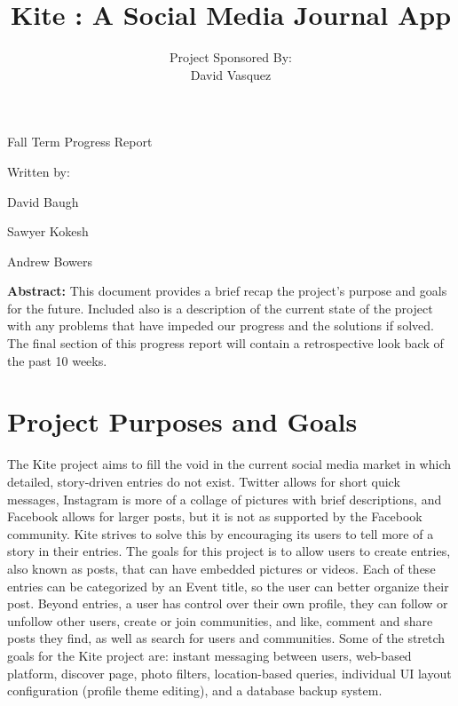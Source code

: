 \documentclass[compsoc, 10, draftclsnofoot, onecolumn]{IEEEtran}
\date{}
\title{Kite : A Social Media Journal App}
\author{ %
	Project Sponsored By: \\
    David Vasquez
}
\begin{document}
\null  %
\nointerlineskip  %
\vfill
\let\snewpage \newpage
\let\newpage \relax
\maketitle
\begin{center}
\huge{Fall Term Progress Report}\par
\vspace{2mm}
\large{Written by:}\par
\normalsize{David Baugh}\par
\normalsize{Sawyer Kokesh}\par
\normalsize{Andrew Bowers}\par
\vspace{8mm}
\large{\textbf{Abstract:} This document provides a brief recap the project's purpose and goals for the future. Included also is a description of the current state of the project with any problems that have impeded our progress and the solutions if solved. The final section of this progress report will contain a retrospective look back of the past 10 weeks.}\par 
\vspace{2mm}
\end{center}
\let \newpage \snewpage
\vfill 
\break %

\tableofcontents
\clearpage

\section{Project Purposes and Goals}
The Kite project aims to fill the void in the current social media market in which detailed, story-driven entries do not exist. Twitter allows for short quick messages, Instagram is more of a collage of pictures with brief descriptions, and Facebook allows for larger posts, but it is not as supported by the Facebook community. Kite strives to solve this by encouraging its users to tell more of a story in their entries. The goals for this project is to allow users to create entries, also known as posts, that can have embedded pictures or videos. Each of these entries can be categorized by an Event title, so the user can better organize their post. Beyond entries, a user has control over their own profile, they can follow or unfollow other users, create or join communities, and like, comment and share posts they find, as well as search for users and communities. Some of the stretch goals for the Kite project are: instant messaging between users, web-based platform, discover page, photo filters, location-based queries, individual UI layout configuration (profile theme editing), and a database backup system.  
\end{document}
